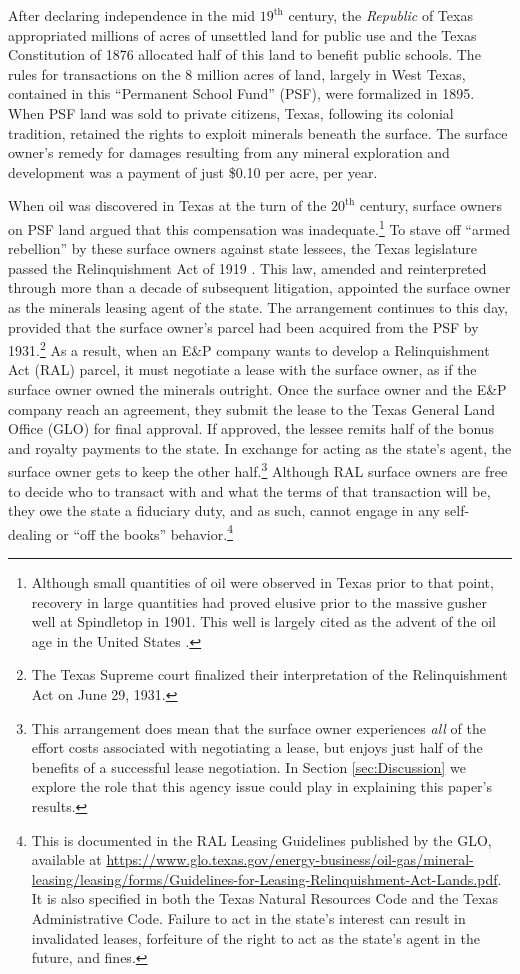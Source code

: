 \documentclass[12pt]{article}
\begin{document}
After declaring independence in the mid $19^{\text{th}}$ century, the \textit{Republic} of Texas appropriated millions of acres of unsettled land for public use and the Texas Constitution of 1876 allocated half of this land to benefit public schools. The rules for transactions on the 8 million acres of land, largely in West Texas, contained in this ``Permanent School Fund'' (PSF), were formalized in 1895.  When PSF land was sold to private citizens, Texas, following its colonial tradition, retained the rights to exploit minerals beneath the surface. The surface owner's remedy for damages resulting from any mineral exploration and development was a payment of just \$0.10 per acre, per year. 

When oil was discovered in Texas at the turn of the $20^{\text{th}}$ century, surface owners on PSF land argued that this compensation was inadequate.\footnote{Although small quantities of oil were observed in Texas prior to that point, recovery in large quantities had proved elusive prior to the massive gusher well at Spindletop in 1901. This well is largely cited as the advent of the oil age in the United States \citep{yergin_prize_2008}.} To stave off ``armed rebellion'' by these surface owners against state lessees, the Texas legislature passed the Relinquishment Act of 1919 \citep{shields_leasing_1981}. This law, amended and reinterpreted through more than a decade of subsequent litigation, appointed the surface owner as the minerals leasing agent of the state. The arrangement continues to this day, provided that the surface owner's parcel had been acquired from the PSF by 1931.\footnote{The Texas Supreme court finalized their interpretation of the Relinquishment Act on June 29, 1931.} As a result, when an E\&P company wants to develop a Relinquishment Act (RAL) parcel, it must negotiate a lease with the surface owner, as if the surface owner owned the minerals outright.  Once the surface owner and the E\&P company reach an agreement, they submit the lease to the Texas General Land Office (GLO) for final approval. If approved, the lessee remits half of the bonus and royalty payments to the state. In exchange for acting as the state's agent, the surface owner gets to keep the other half.\footnote{This arrangement does mean that the surface owner experiences \textit{all} of the effort costs associated with negotiating a lease, but enjoys just half of the benefits of a successful lease negotiation.  In Section \ref{sec:Discussion} we explore the role that this agency issue could play in explaining this paper's results.}  Although RAL surface owners are free to decide who to transact with and what the terms of that transaction will be, they owe the state a fiduciary duty, and as such, cannot engage in any self-dealing or ``off the books'' behavior.\footnote{This is documented in the RAL Leasing Guidelines published by the GLO, available at \url{https://www.glo.texas.gov/energy-business/oil-gas/mineral-leasing/leasing/forms/Guidelines-for-Leasing-Relinquishment-Act-Lands.pdf}.  It is also specified in both the Texas Natural Resources Code and the Texas Administrative Code.  Failure to act in the state's interest can result in invalidated leases, forfeiture of the right to act as the state's agent in the future, and fines.}  
\end{document}
